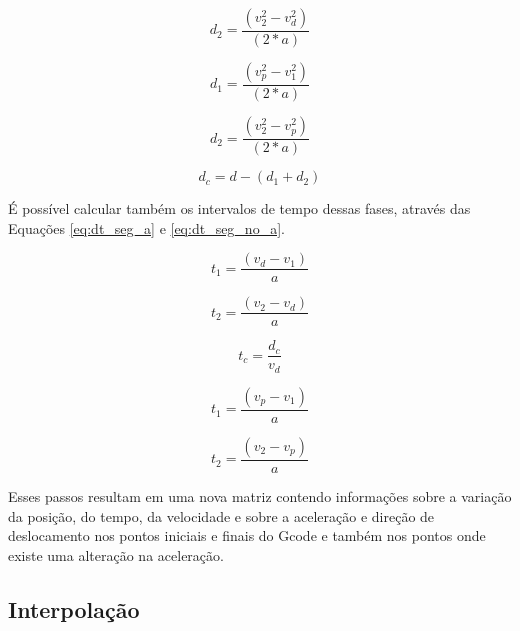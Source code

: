 \begin{equation}
    \label{eq:des_seg_a}
    d_2 = \frac{(v_2^2-v_d^2)}{(2*a)}
\end{equation}

\begin{equation}
    \label{eq:des_seg_a}
    d_1 = \frac{(v_p^2-v_1^2)}{(2*a)}
\end{equation}

\begin{equation}
    \label{eq:des_seg_a}
    d_2 = \frac{(v_2^2-v_p^2)}{(2*a)}
\end{equation}

\begin{equation}
    \label{eq:des_seg_no_a}
    d_c = d-(d_1+d_2)
\end{equation}

É possível calcular também os intervalos de tempo dessas fases, através das 
Equações \ref{eq:dt_seg_a} e \ref{eq:dt_seg_no_a}.

\begin{equation}
    \label{eq:dt_seg_a}
    t_1 = \frac{(v_d-v_1)}{a}
\end{equation}

\begin{equation}
    \label{eq:dt_seg_a}
    t_2 = \frac{(v_2-v_d)}{a}
\end{equation}

\begin{equation}
    \label{eq:dt_seg_no_a}
    t_c = \frac{d_c}{v_d}
\end{equation}

\begin{equation}
    \label{eq:dt_seg_a}
    t_1 = \frac{(v_p-v_1)}{a}
\end{equation}

\begin{equation}
    \label{eq:dt_seg_a}
    t_2 = \frac{(v_2-v_p)}{a}
\end{equation}


Esses passos resultam em uma nova matriz contendo informações
sobre a variação da posição, do tempo, da velocidade e sobre a aceleração e 
direção de deslocamento nos pontos iniciais e finais do Gcode e também nos pontos
onde existe uma alteração na aceleração.

\subsection{Interpolação}

